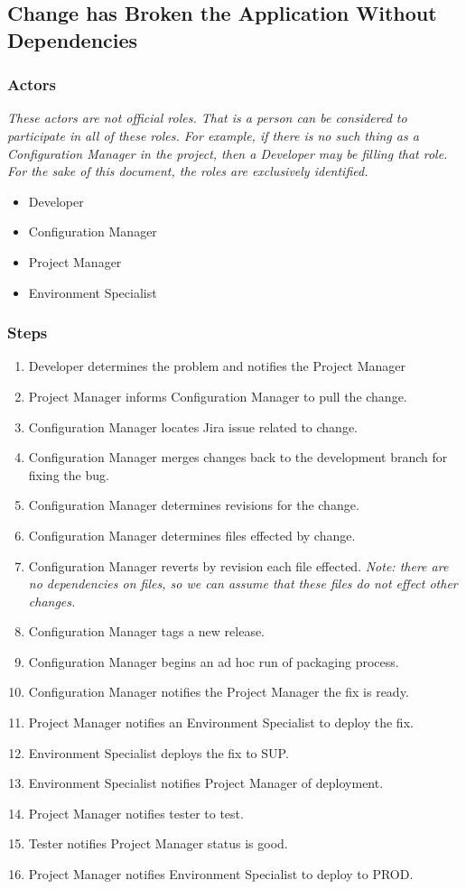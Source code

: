 \documentclass[12pt,notitlepage]{article}
\begin{document}
\subsection{Change has Broken the Application Without Dependencies}

\subsubsection{Actors}
\emph{These actors are not official roles. That is a person can be considered to
participate in all of these roles. For example, if there is no such thing as a Configuration
Manager in the project, then a Developer may be filling that role. For the sake of
this document, the roles are exclusively identified.}
\begin{itemize}
\item Developer
\item Configuration Manager
\item Project Manager
\item Environment Specialist
\end{itemize}

\subsubsection{Steps}
\begin{enumerate}
\item Developer determines the problem and notifies the Project Manager
\item Project Manager informs Configuration Manager to pull the change.
\item Configuration Manager locates Jira issue related to change.
\item Configuration Manager merges changes back to the development branch for fixing the bug.
\item Configuration Manager determines revisions for the change.
\item Configuration Manager determines files effected by change.
\item Configuration Manager reverts by revision each file effected. \emph{Note: there are no dependencies
  on files, so we can assume that these files do not effect other changes.}
\item Configuration Manager tags a new release.
\item Configuration Manager begins an ad hoc run of packaging process.
\item Configuration Manager notifies the Project Manager the fix is ready.
\item Project Manager notifies an Environment Specialist to deploy the fix.
\item Environment Specialist deploys the fix to SUP.
\item Environment Specialist notifies Project Manager of deployment.
\item Project Manager notifies tester to test.
\item Tester notifies Project Manager status is good.
\item Project Manager notifies Environment Specialist to deploy to PROD.
\end{enumerate}
\end{document}
